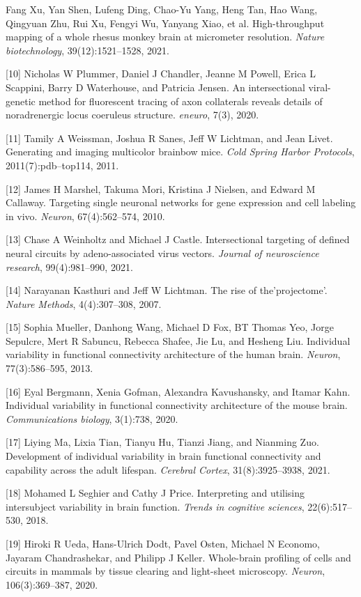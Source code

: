 \documentclass{article}
\begin{document}
\begin{hangpars}
[9] Fang Xu, Yan Shen, Lufeng Ding, Chao-Yu Yang, Heng Tan, Hao Wang, Qingyuan Zhu, Rui Xu, Fengyi Wu, Yanyang Xiao, et al. High-throughput mapping of a whole rhesus monkey brain at micrometer resolution. \emph{Nature biotechnology}, 39(12):1521–1528, 2021.

[10] Nicholas W Plummer, Daniel J Chandler, Jeanne M Powell, Erica L Scappini, Barry D Waterhouse, and Patricia Jensen. An intersectional viral-genetic method for fluorescent tracing of axon collaterals reveals details of noradrenergic locus coeruleus structure. \emph{eneuro}, 7(3), 2020.

[11] Tamily A Weissman, Joshua R Sanes, Jeff W Lichtman, and Jean Livet. Generating and imaging multicolor brainbow mice. \emph{Cold Spring Harbor Protocols}, 2011(7):pdb–top114, 2011.

[12] James H Marshel, Takuma Mori, Kristina J Nielsen, and Edward M Callaway. Targeting single neuronal networks for gene expression and cell labeling in vivo. \emph{Neuron}, 67(4):562–574, 2010.

[13] Chase A Weinholtz and Michael J Castle. Intersectional targeting of defined neural circuits by adeno-associated virus vectors. \emph{Journal of neuroscience research}, 99(4):981–990, 2021.

[14] Narayanan Kasthuri and Jeff W Lichtman. The rise of the’projectome’. \emph{Nature Methods}, 4(4):307–308, 2007.

[15] Sophia Mueller, Danhong Wang, Michael D Fox, BT Thomas Yeo, Jorge Sepulcre, Mert R Sabuncu, Rebecca Shafee, Jie Lu, and Hesheng Liu. Individual variability in functional connectivity architecture of the human brain. \emph{Neuron}, 77(3):586–595, 2013.

[16] Eyal Bergmann, Xenia Gofman, Alexandra Kavushansky, and Itamar Kahn. Individual variability in functional connectivity architecture of the mouse brain. \emph{Communications biology}, 3(1):738, 2020.

[17] Liying Ma, Lixia Tian, Tianyu Hu, Tianzi Jiang, and Nianming Zuo. Development of individual variability in brain functional connectivity and capability across the adult lifespan. \emph{Cerebral Cortex}, 31(8):3925–3938, 2021.

[18] Mohamed L Seghier and Cathy J Price. Interpreting and utilising intersubject variability in brain function. \emph{Trends in cognitive sciences}, 22(6):517–530, 2018.

[19] Hiroki R Ueda, Hans-Ulrich Dodt, Pavel Osten, Michael N Economo, Jayaram Chandrashekar, and Philipp J Keller. Whole-brain profiling of cells and circuits in mammals by tissue clearing and light-sheet microscopy. \emph{Neuron}, 106(3):369–387, 2020.


\end{hangpars}
\end{document}
